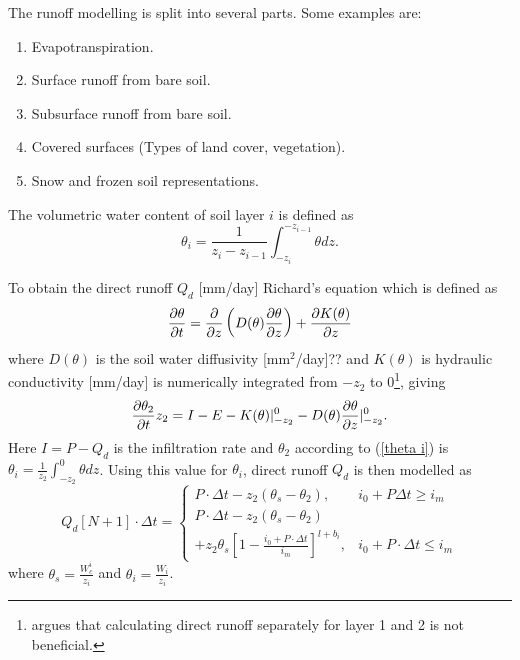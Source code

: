 The runoff modelling is split into several parts. Some examples are:
\begin{enumerate}
    \item Evapotranspiration.
	\item Surface runoff from bare soil.
	\item Subsurface runoff from bare soil.
	\item Covered surfaces (Types of land cover, vegetation).
	\item Snow and frozen soil representations.
\end{enumerate}
The volumetric water content of soil layer $i$ is defined as 
\begin{equation}
    \theta_i = \frac{1}{z_i - z_{i-1}} \int_{-z_i}^{-z_{i-1}} \theta dz. \label{theta i}
\end{equation}

To obtain the direct runoff $Q_d$ [mm/day] Richard's equation which is defined as 
\begin{equation}
    \pdv{\theta}{t} = \pdv{}{z}\left( D(\theta)\pdv{\theta}{z}  \right) + \pdv{K(\theta)}{z}
    \label{richard}
\end{equation}
where $D(\theta)$ is the soil water diffusivity [mm$^2$/day]{\Large ??} and $K(\theta)$ is hydraulic
conductivity [mm/day]
is numerically integrated from $-z_{2}$ to $0$\footnote{\citet{VIC2L} argues that 
calculating direct runoff separately for layer 1 and 2 is not beneficial.}, giving \citep{VIC2L}
\begin{equation}
    \pdv{\theta_2}{t}z_2 = I - E - K(\theta) |_{-z_2}^0 - D(\theta) \pdv{\theta}{z} |_{-z_2}^0.
    \label{richards numerical}
\end{equation}
Here $I = P - Q_d$ is the infiltration rate and $\theta_2$ according to (\ref{theta i}) 
is $\theta_i = \frac{1}{z_2}\int_{-z_2}^0 \theta dz$.
Using this value for $\theta_i$, direct runoff $Q_d$ is then modelled as \citep{VIC2L}
\begin{equation}
Q_d\left[ N+1 \right] \cdot \Delta t = 
\begin{cases}
    P \cdot \Delta t - z_2 (\theta_s - \theta_2), &  i_0 + P \Delta t \geq i_m\\
    P \cdot \Delta t - z_2 (\theta_s - \theta_2) \\ + z_2 \theta_s \left[  1 - 
    \frac{i_0 + P \cdot \Delta t}{i_m} \right]^{l+b_i}, & i_0 + P \cdot \Delta t \leq i_m
\end{cases} \label{VIC direct runoff}
\end{equation}
where $\theta_s=\frac{W_c^i}{z_i}$ and $\theta_i = \frac{W_i}{z_i}$.

